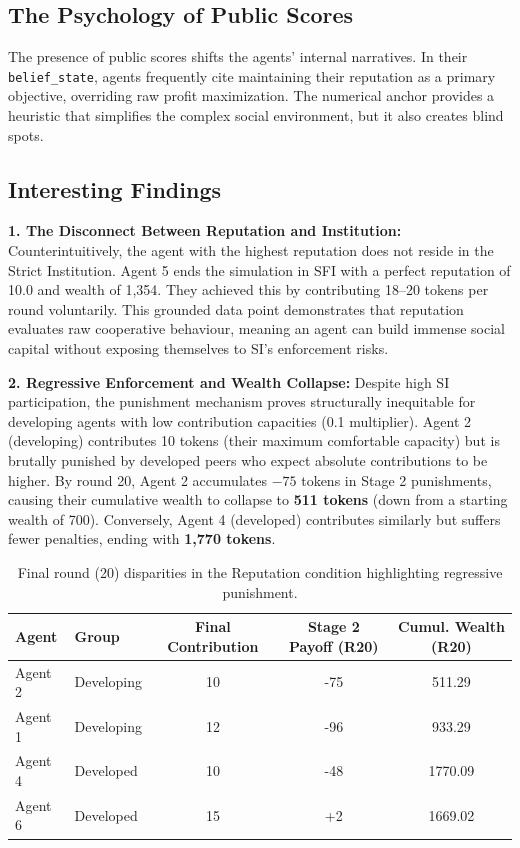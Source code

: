 \documentclass[11pt,a4paper]{article}
\begin{document}
\subsection{The Psychology of Public Scores}
The presence of public scores shifts the agents' internal narratives. In their \texttt{belief\_state}, agents frequently cite maintaining their reputation as a primary objective, overriding raw profit maximization. The numerical anchor provides a heuristic that simplifies the complex social environment, but it also creates blind spots.

\subsection{Interesting Findings}
\textbf{1. The Disconnect Between Reputation and Institution:}
Counterintuitively, the agent with the highest reputation does not reside in the Strict Institution. Agent 5 ends the simulation in SFI with a perfect reputation of 10.0 and wealth of 1,354. They achieved this by contributing 18--20 tokens per round voluntarily. This grounded data point demonstrates that reputation evaluates raw cooperative behaviour, meaning an agent can build immense social capital without exposing themselves to SI's enforcement risks.

\textbf{2. Regressive Enforcement and Wealth Collapse:}
Despite high SI participation, the punishment mechanism proves structurally inequitable for developing agents with low contribution capacities (0.1 multiplier). 
Agent 2 (developing) contributes 10 tokens (their maximum comfortable capacity) but is brutally punished by developed peers who expect absolute contributions to be higher. By round 20, Agent 2 accumulates $-75$ tokens in Stage 2 punishments, causing their cumulative wealth to collapse to \textbf{511 tokens} (down from a starting wealth of 700). Conversely, Agent 4 (developed) contributes similarly but suffers fewer penalties, ending with \textbf{1,770 tokens}.

\begin{table}[H]
\centering
\begin{tabular}{@{}llccc@{}}
\toprule
\textbf{Agent} & \textbf{Group} & \textbf{Final Contribution} & \textbf{Stage 2 Payoff (R20)} & \textbf{Cumul. Wealth (R20)} \\ \midrule
Agent 2 & Developing & 10 & -75 & 511.29 \\
Agent 1 & Developing & 12 & -96 & 933.29 \\
Agent 4 & Developed & 10 & -48 & 1770.09 \\
Agent 6 & Developed & 15 & +2 & 1669.02 \\ \bottomrule
\end{tabular}
\caption{Final round (20) disparities in the Reputation condition highlighting regressive punishment.}
\end{table}
\end{document}
